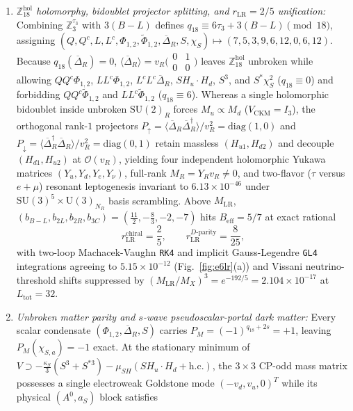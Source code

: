 \documentclass[aps,prd,twocolumn,nofootinbib,floatfix]{revtex4-2}
\begin{document}
\begin{enumerate}
    \item \emph{$\mathbb{Z}_{18}^{\mathrm{hol}}$ holomorphy, bidoublet projector splitting, and $r_{\mathrm{LR}} = 2/5$ unification:} Combining $\mathbb{Z}_3^{\tau_3}$ with $3(B-L)$ defines $q_{18} \equiv 6\tau_3 + 3(B-L) \pmod{18}$, assigning $(Q, Q^c, L, L^c, \Phi_{1,2}, \tilde{\Phi}_{1,2}, \overline{\Delta}_R, S, \chi_S) \mapsto (7, 5, 3, 9, 6, 12, 0, 6, 12)$. Because $q_{18}(\overline{\Delta}_R) = 0$, $\langle\overline{\Delta}_R\rangle = v_R\bigl(\begin{smallmatrix}0&1\\0&0\end{smallmatrix}\bigr)$ leaves $\mathbb{Z}_{18}^{\mathrm{hol}}$ unbroken while allowing $Q Q^c\Phi_{1,2}$, $L L^c\Phi_{1,2}$, $L^c L^c\overline{\Delta}_R$, $S H_u\cdot H_d$, $S^3$, and $S^*\chi_S^2$ ($q_{18} \equiv 0$) and forbidding $Q Q^c\tilde{\Phi}_{1,2}$ and $L L^c\tilde{\Phi}_{1,2}$ ($q_{18} \equiv 6$). Whereas a single holomorphic bidoublet inside unbroken $\mathrm{SU}(2)_R$ forces $M_u \propto M_d$ ($V_{\mathrm{CKM}} = I_3$), the orthogonal rank-$1$ projectors $P_\uparrow = \langle\overline{\Delta}_R\overline{\Delta}_R^\dagger\rangle/v_R^2 = \mathrm{diag}(1,0)$ and $P_\downarrow = \langle\overline{\Delta}_R^\dagger\overline{\Delta}_R\rangle/v_R^2 = \mathrm{diag}(0,1)$ retain massless $(H_{u1}, H_{d2})$ and decouple $(H_{d1}, H_{u2})$ at $\mathcal{O}(v_R)$, yielding four independent holomorphic Yukawa matrices $(Y_u, Y_d, Y_e, Y_\nu)$, full-rank $M_R = Y_R v_R \ne 0$, and two-flavor ($\tau$ versus $e+\mu$) resonant leptogenesis invariant to $6.13\times 10^{-46}$ under $\mathrm{SU}(3)^5\times\mathrm{U}(3)_{N_R}$ basis scrambling. Above $M_{\mathrm{LR}}$, $(b_{B-L}, b_{2L}, b_{2R}, b_{3C}) = (\frac{11}{2}, -\frac{8}{3}, -2, -7)$ hits $B_{\mathrm{eff}} = 5/7$ at exact rational
    \begin{equation}
    \label{eq:r_lr_exact}
    r_{\mathrm{LR}}^{\mathrm{chiral}} = \frac{2}{5}, \qquad r_{\mathrm{LR}}^{D\text{-}\mathrm{parity}} = \frac{8}{25},
    \end{equation}
    with two-loop Machacek-Vaughn \texttt{RK4} and implicit Gauss-Legendre \texttt{GL4} integrations agreeing to $5.15\times 10^{-12}$ (Fig.~\ref{fig:e6lr}(a)) and Vissani neutrino-threshold shifts suppressed by $(M_{\mathrm{LR}}/M_X)^3 = e^{-192/5} = 2.104\times 10^{-17}$ at $L_{\mathrm{tot}} = 32$.
    \item \emph{Unbroken matter parity and $s$-wave pseudoscalar-portal dark matter:} Every scalar condensate $(\Phi_{1,2}, \overline{\Delta}_R, S)$ carries $P_M = (-1)^{q_{18}+2s} = +1$, leaving $P_M(\chi_{S,a}) = -1$ exact. At the stationary minimum of $V \supset -\frac{\kappa_S}{3}(S^3 + S^{*3}) - \mu_{SH}(S H_u\cdot H_d + \mathrm{h.c.})$, the $3\times 3$ CP-odd mass matrix possesses a single electroweak Goldstone mode $(-v_d, v_u, 0)^T$ while its physical $(A^0, a_S)$ block satisfies

\end{enumerate}
\end{document}
